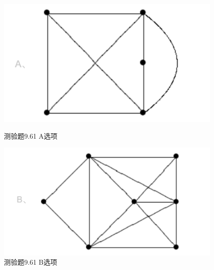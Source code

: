 \documentclass[UTF8, heading=true]{ctexart}
\begin{document}
\begin{figure}[htbp]
    \centering
    \begin{minipage}[t]{0.35\textwidth}
        \centering
        \includegraphics[width=1\textwidth]{9.61_1.png} %
	      \vspace{-0.3cm}
        \caption{测验题9.61 A选项}
    \end{minipage}
	  \hspace{0.1\textwidth} %
    \begin{minipage}[t]{0.35\textwidth}
        \centering
        \includegraphics[width=1\textwidth]{9.61_2.png} %
	      \vspace{-0.3cm}
        \caption{测验题9.61 B选项}
\end{minipage}
\end{figure}
\end{document}
